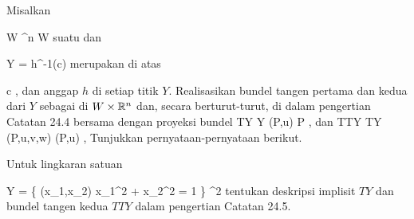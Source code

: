 {}
{

Misalkan

\mavergleichskette
{\vergleichskette
{ W
}
{ \subseteq }{ \R^n
}
{  }{
}
{    }{
}
{   }{
}
}
{}{}{}
 { W } { \R
} {}
suatu
dan

\mavergleichskette
{\vergleichskette
{ Y
}
{ = }{ h^{-1}(c)
}
{  }{
}
{    }{
}
{   }{
}
}
{}{}{}
merupakan
di atas

\mavergleichskette
{\vergleichskette
{ c
}
{ \in }{ \R
}
{  }{
}
{    }{
}
{   }{
}
}
{}{}{,}
dan anggap $h$
di setiap titik $Y$. Realisasikan bundel tangen pertama dan kedua
dari $Y$ sebagai
di $W \times {\mathbb R}^n$ dan, secara berturut-turut, di
 dalam pengertian
Catatan 24.4
bersama dengan proyeksi bundel
\maabbeledisp {\pi} {TY} {Y
} {(P,u)} {P
} {,}
dan
 {TTY} {TY
} {(P,u,v,w)} {(P,u)
} {,}
Tunjukkan pernyataan-pernyataan berikut.

}
{} {}

{}
{

Untuk lingkaran satuan

\mavergleichskettedisp
{\vergleichskette
{ Y
}
{ =} { \left\{ (x_1,x_2)  \mid   x_1^2 + x_2^2 = 1         \right\}
}
{ \subset} { \R^2
}
{ } {
}
{ } {
}
}
{}{}{}
tentukan deskripsi implisit
$TY$ dan bundel tangen kedua $TTY$ dalam pengertian
Catatan 24.5.

}
{} {}

